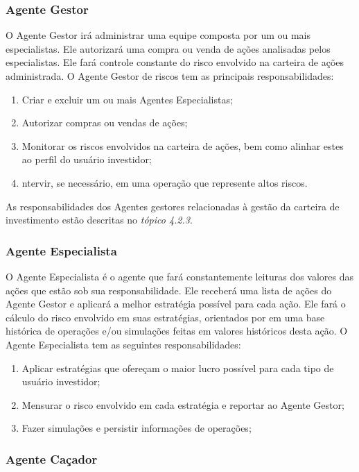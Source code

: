 \subsubsection{Agente Gestor}
O Agente Gestor irá administrar uma equipe composta por um ou mais especialistas. Ele autorizará uma compra ou venda de ações analisadas pelos especialistas. Ele fará controle constante do risco envolvido na carteira de ações administrada. O Agente Gestor de riscos tem as principais responsabilidades:
\begin{enumerate}
\item Criar e excluir um ou mais Agentes Especialistas;
\item Autorizar compras ou vendas de ações;
\item Monitorar os riscos envolvidos na carteira de ações, bem como alinhar estes ao perfil do usuário investidor;
\item ntervir, se necessário, em uma operação que represente altos riscos.
\end{enumerate}

As responsabilidades dos Agentes gestores relacionadas à gestão da carteira de investimento estão descritas no \textit{tópico 4.2.3}.

\subsubsection{Agente Especialista}

O Agente Especialista é o agente que fará constantemente leituras dos valores das ações que estão sob sua responsabilidade. Ele receberá uma lista de ações do Agente Gestor e aplicará a melhor estratégia possível para cada ação. Ele fará o cálculo do risco envolvido em suas estratégias, orientados por em uma base histórica de operações e/ou simulações feitas em valores históricos desta ação. O Agente Especialista tem as seguintes responsabilidades:

\begin{enumerate}
\item Aplicar estratégias que ofereçam o maior lucro possível para cada tipo de usuário investidor;
\item Mensurar o risco envolvido em cada estratégia e reportar ao Agente Gestor;
\item Fazer simulações e persistir informações de operações;
\end{enumerate}

\subsubsection{Agente Caçador}

